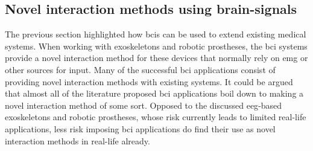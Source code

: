 
\subsection{Novel interaction methods using brain-signals}
\label{subsec:bci_helping_disabled_novel_interaction}

The previous section highlighted how \glspl{bci} can be used to extend existing medical systems.
When working with exoskeletons and robotic prostheses, the \gls{bci} systems provide a novel interaction method for these devices that normally rely on \gls{emg} or other sources for input.
Many of the successful \gls{bci} applications consist of providing novel interaction methods with existing systems.
It could be argued that almost all of the literature proposed \gls{bci} applications boil down to making a novel interaction method of some sort.
Opposed to the discussed \gls{eeg}-based exoskeletons and robotic prostheses, whose risk currently leads to limited real-life applications, less risk imposing \gls{bci} applications do find their use as novel interaction methods in real-life already.

